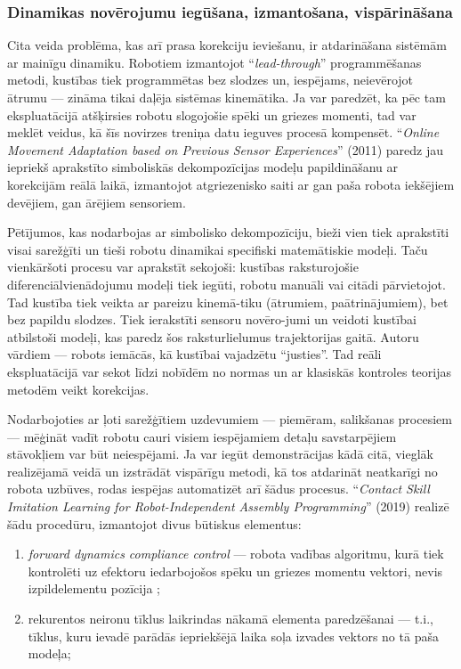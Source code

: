 \documentclass[12pt, a4paper]{article}
\numberwithin{equation}{section} %
\begin{document}
\subsubsection{Dinamikas novērojumu iegūšana, izmantošana, vispārināšana} 

Cita veida problēma, kas arī prasa korekciju ieviešanu, ir atdarināšana sistēmām ar mainīgu dinamiku. Robotiem izmantojot ``\textit{lead-through}'' programmēšanas metodi, kustības tiek programmētas bez slodzes un, iespējams, neievērojot ātrumu --- zināma tikai daļēja sistēmas kinemātika. Ja var paredzēt, ka pēc tam ekspluatācijā atšķirsies robotu slogojošie spēki un griezes momenti, tad var meklēt veidus, kā šīs novirzes treniņa datu ieguves procesā kompensēt. ``\textit{Online Movement Adaptation based on Previous Sensor Experiences}'' \cite{pastor2011online} (2011) paredz jau iepriekš aprakstīto simboliskās dekompozīcijas modeļu papildināšanu ar korekcijām reālā laikā, izmantojot atgriezenisko saiti ar gan paša robota iekšējiem devējiem, gan ārējiem sensoriem. 

Pētījumos, kas nodarbojas ar simbolisko dekompozīciju, bieži vien tiek aprakstīti visai sarežģīti un tieši robotu dinamikai specifiski matemātiskie modeļi. Taču vienkāršoti procesu var aprakstīt sekojoši: kustības raksturojošie diferenciālvienādojumu modeļi tiek iegūti, robotu manuāli vai citādi pārvietojot. Tad kustība tiek veikta ar pareizu kinemā-tiku (ātrumiem, paātrinājumiem), bet bez papildu slodzes. Tiek ierakstīti sensoru novēro-jumi un veidoti kustībai atbilstoši modeļi, kas paredz šos raksturlielumus trajektorijas gaitā. Autoru vārdiem --- robots iemācās, kā kustībai vajadzētu ``justies''. Tad reāli ekspluatācijā var sekot līdzi nobīdēm no normas un ar klasiskās kontroles teorijas metodēm veikt korekcijas.

Nodarbojoties ar ļoti sarežģītiem uzdevumiem --- piemēram, salikšanas procesiem --- mēģināt vadīt robotu cauri visiem iespējamiem detaļu savstarpējiem stāvokļiem var būt neiespējami. Ja var iegūt demonstrācijas kādā citā, vieglāk realizējamā veidā un izstrādāt vispārīgu metodi, kā tos atdarināt neatkarīgi no robota uzbūves, rodas iespējas automatizēt arī šādus procesus. ``\textit{Contact Skill Imitation Learning for Robot-Independent Assembly Programming}'' \cite{scherzinger2019contact} (2019) realizē šādu procedūru, izmantojot divus būtiskus elementus:

\begin{enumerate}
    \item \textit{forward dynamics compliance control} --- robota vadības algoritmu, kurā tiek kontrolēti uz efektoru iedarbojošos spēku un griezes momentu vektori, nevis izpildelementu pozīcija \cite{scherzinger2017forward};
    \item rekurentos neironu tīklus laikrindas nākamā elementa paredzēšanai --- t.i., tīklus, kuru ievadē parādās iepriekšējā laika soļa izvades vektors no tā paša modeļa;
\end{enumerate}
\end{document}
